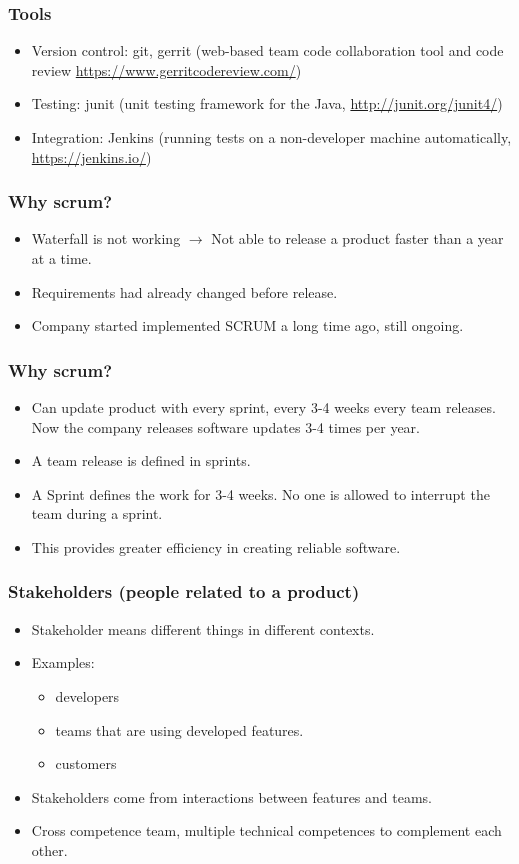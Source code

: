 \documentclass{beamer}
\begin{document}
\begin{frame}
  \frametitle{Tools}
  \begin{itemize}
  \item Version control: git, gerrit (web-based team code
    collaboration tool and code review \url{https://www.gerritcodereview.com/})
  \item Testing: junit (unit testing framework for the Java, \url{http://junit.org/junit4/})
  \item Integration: Jenkins (running tests on a non-developer
    machine automatically, \url{https://jenkins.io/})
  \end{itemize}
\end{frame}

\begin{frame}
  \frametitle{Why scrum? }
  \begin{itemize}

  \item Waterfall is not working $\rightarrow$ Not able to release a
    product faster than a year at a time.
  \item Requirements had already changed before release.
  \item Company started implemented SCRUM a long time ago, still
    ongoing.
  \end{itemize}
\end{frame}

\begin{frame}
  \frametitle{Why scrum?}
  \begin{itemize}
  \item Can update product with every sprint, every 3-4 weeks every
    team releases. Now the company releases software updates 3-4 times per year.
  \item A team release is defined in sprints.
  \item A Sprint defines the work for 3-4 weeks. No one is allowed to
    interrupt the team during a sprint.
  \item This provides greater efficiency in creating reliable
    software.
\end{itemize}
\end{frame}

\begin{frame}
  \frametitle{Stakeholders (people related to a product)}
  \begin{itemize}
  \item Stakeholder means different things in different contexts.
  \item Examples:
    \begin{itemize}
    \item developers
    \item teams that are using developed features.
    \item customers
    \end{itemize}
  \item Stakeholders come from interactions between features and teams.
  \item Cross competence team, multiple technical competences to
    complement each other.
  \end{itemize}
\end{frame}
\end{document}
